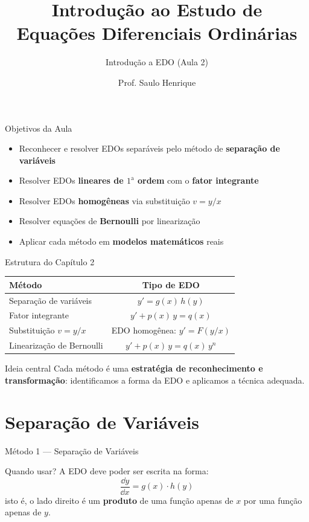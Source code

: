 \documentclass[11pt, aspectratio=169, xcolor=table]{beamer}
\title{Introdução ao Estudo de\\[4pt] Equações Diferenciais Ordinárias}
\subtitle{Introdução a EDO (Aula 2)}
\author{Prof. Saulo Henrique}
\begin{document}
\slidetitulo


\begin{frame}{Objetivos da Aula}
\begin{itemize}
  \item Reconhecer e resolver EDOs separáveis pelo método de \textbf{separação de variáveis}
  \item Resolver EDOs \textbf{lineares de $1^{\text{a}}$ ordem} com o \textbf{fator integrante}
  \item Resolver EDOs \textbf{homogêneas} via substituição \(v = y/x\)
  \item Resolver equações de \textbf{Bernoulli} por linearização
  \item Aplicar cada método em \textbf{modelos matemáticos} reais
\end{itemize}
\end{frame}

\begin{frame}{Estrutura do Capítulo 2}
\centering
{}
\begin{tabular}{lc}
\textcolor{accent}{\textbf{Método}} & \textcolor{accent}{\textbf{Tipo de EDO}} \\
\hline
Separação de variáveis & $y' = g(x)\,h(y)$ \\
Fator integrante & $y' + p(x)\,y = q(x)$ \\
Substituição $v = y/x$ & EDO homogênea: $y' = F(y/x)$ \\
Linearização de Bernoulli & $y' + p(x)\,y = q(x)\,y^n$ \\
\end{tabular}

\vspace{1.5em}
\begin{block}{Ideia central}
Cada método é uma \textbf{estratégia de reconhecimento e transformação}: identificamos a forma da EDO e aplicamos a técnica adequada.
\end{block}
\end{frame}

\section{Separação de Variáveis}

\begin{frame}{Método 1 --- Separação de Variáveis}
\begin{block}{Quando usar?}
A EDO deve poder ser escrita na forma:
\[
\frac{\dd y}{\dd x} = g(x)\cdot h(y)
\]
isto é, o lado direito é um \textbf{produto} de uma função apenas de \(x\) por uma função apenas de \(y\).
\end{block}
\end{frame}
\end{document}
